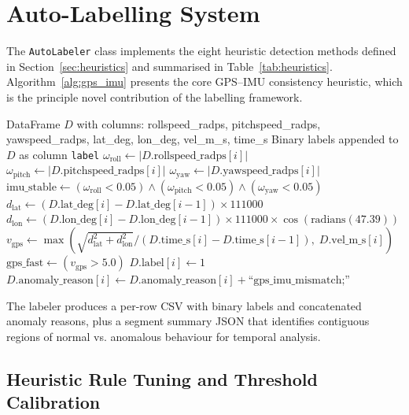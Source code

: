\section{Auto-Labelling System}

The \texttt{AutoLabeler} class implements the eight heuristic detection methods defined in Section~\ref{sec:heuristics} and summarised in Table~\ref{tab:heuristics}. Algorithm~\ref{alg:gps_imu} presents the core GPS--IMU consistency heuristic, which is the principle novel contribution of the labelling framework.

\begin{algorithm}[H]
\caption{GPS--IMU Consistency Check (Heuristic H8)}
\label{alg:gps_imu}
\begin{algorithmic}[1]
\Require DataFrame $D$ with columns: rollspeed\_radps, pitchspeed\_radps, yawspeed\_radps, lat\_deg, lon\_deg, vel\_m\_s, time\_s
\Ensure Binary labels appended to $D$ as column \texttt{label}
    \State $\omega_{\text{roll}} \gets \vert D.\text{rollspeed\_radps}[i] \vert$
    \State $\omega_{\text{pitch}} \gets \vert D.\text{pitchspeed\_radps}[i] \vert$
    \State $\omega_{\text{yaw}} \gets \vert D.\text{yawspeed\_radps}[i] \vert$
    \State $\text{imu\_stable} \gets (\omega_{\text{roll}} < 0.05) \land (\omega_{\text{pitch}} < 0.05) \land (\omega_{\text{yaw}} < 0.05)$
    \State $d_{\text{lat}} \gets (D.\text{lat\_deg}[i] - D.\text{lat\_deg}[i-1]) \times 111000$
    \State $d_{\text{lon}} \gets (D.\text{lon\_deg}[i] - D.\text{lon\_deg}[i-1]) \times 111000 \times \cos(\text{radians}(47.39))$
    \State $v_{\text{gps}} \gets \max(\sqrt{d_{\text{lat}}^2 + d_{\text{lon}}^2} / (D.\text{time\_s}[i] - D.\text{time\_s}[i-1]),\; D.\text{vel\_m\_s}[i])$
    \State $\text{gps\_fast} \gets (v_{\text{gps}} > 5.0)$
        \State $D.\text{label}[i] \gets 1$
        \State $D.\text{anomaly\_reason}[i] \gets D.\text{anomaly\_reason}[i] + \text{``gps\_imu\_mismatch;''}$
    \EndIf
\EndFor
\end{algorithmic}
\end{algorithm}

The labeler produces a per-row CSV with binary labels and concatenated anomaly reasons, plus a segment summary JSON that identifies contiguous regions of normal vs. anomalous behaviour for temporal analysis.

\subsection{Heuristic Rule Tuning and Threshold Calibration}

